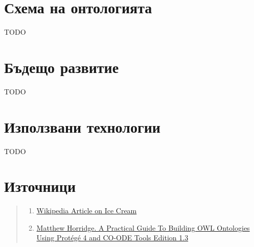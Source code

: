 \documentclass[12pt]{article}
\begin{document}
\section{Схема на онтологията}

TODO



\section{Бъдещо развитие}

TODO




\section{Използвани технологии}

TODO







\listoffigures

\section{Източници}

\begin{quote}

    \begin{enumerate}
    
    \item \href{https://en.wikipedia.org/wiki/Ice_cream}{Wikipedia Article on Ice Cream}
    
    \item \href{https://www.researchgate.net/publication/272829948_A_Practical_Guide_To_Building_OWL_Ontologies_Using_Protege_4_and_CO-ODE_Tools_Edition_13}{Matthew Horridge. A Practical Guide To Building OWL Ontologies Using Protégé 4 and CO-ODE Tools Edition 1.3}

    
    
    \end{enumerate}

\end{quote}
\end{document}
